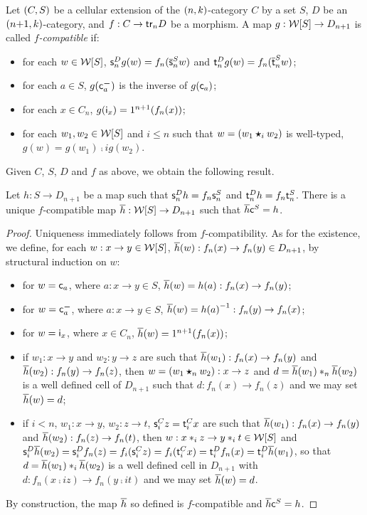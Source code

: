  \begin{paragr}
   Let $(C,S)$ be a cellular extension of the $(n,k)$-category
   $C$ by a set $S$, $D$ be an $(n{+}1,k)$-category, and $f:C\to \mathsf{tr}_{n}
   D$ be a morphism. A map $g:\mathcal{W}[S]\to D_{n+1}$ is called {\em $f$-compatible} if:
   \begin{itemize}
   \item for each $w\in\mathcal{W}[S]$, $\mathsf{s}_{n}^Dg(w)=f_n(\overline{\mathsf{s}}_{n}^S w)$ and
     $\mathsf{t}_{n}^D g(w)=f_n(\overline{\mathsf{t}}_{n}^S w)$;
    \item for each $a\in S$, $g(\mathsf{c}^{\boldsymbol{-}}_{a})$ is the inverse of $g(\mathsf{c}_{a})$;
    \item for each $x\in C_n$, $g(\mathsf{i}_{x})=1^{n+1}(f_n(x))$;
    \item for each $w_1,w_2\in\mathcal{W}[S]$ and $i\leq n$ such that
      $w=(w_1\bm{\star}_{i} w_2)$ is well-typed, $g(w)=g(w_1)\comp i g(w_2)$.  
    \end{itemize}
    Given $C$, $S$, $D$ and $f$ as above, we obtain the following result.
  \end{paragr}
  \begin{lemma}\label{lemma:mapext}
    Let $h:S\to D_{n+1}$ be a map such that $\mathsf{s}_{n}^Dh=f_n \mathsf{s}_{n}^S$ and $\mathsf{t}_{n}^Dh=f_{n} \mathsf{t}_{n}^S$. There is a unique
    $f$-compatible map
    $\overline{h}:\mathcal{W}[S]\to D_{n+1}$
    such that $\overline{h}\mathsf{c}^{S}=h$.
  \end{lemma}
  \begin{proof}
    Uniqueness immediately follows from $f$-compatibility. As for the
    existence, we define, for each $w:x\to y\in\mathcal{W}[S]$,
  $\overline{h}(w):f_n(x)\to f_n(y)\in D_{n+1}$, by structural induction
  on $w$:
  \begin{itemize}
  \item for $w=\mathsf{c}_{a}$, where $a:x\to y\in S$, $\overline{h}(w)=h(a):f_n(x)\to f_n(y)$;
  \item for $w=\mathsf{c}^{\boldsymbol{-}}_{a}$, where $a:x\to y\in S$, $\overline{h}(w)={h(a)}^{-1}:f_n(y)\to f_n(x)$;
  \item for $w=\mathsf{i}_{x}$, where $x\in C_n$, $\overline{h}(w)=1^{n+1}(f_n(x))$;
  \item if $w_1:x\to y$ and $w_2:y\to z$ are such that $\overline{h}(w_1):f_n(x)\to f_n(y)$ and $\overline{h}(w_2):f_n(y)\to f_n(z)$,
    then $w=(w_1\bm{\star}_{n} w_2):x\to z$ and $d=\overline{h}(w_1)\ast_{n}\overline{h}(w_2)$ is a well defined cell of $D_{n+1}$ such that
    $d:f_n(x)\to f_n(z)$ and we may set $\overline{h}(w)=d$;
  \item if $i<n$, $w_1:x\to y$, $w_2:z\to t$, $\mathsf{s}_{i}^Cz=\mathsf{t}_{i}^Cx $
    are such that $\overline{h}(w_1):f_n(x)\to f_n(y)$ and
    $\overline{h}(w_2):f_n(z)\to f_n(t)$, then
    $w:x\ast_{i} z\to y\ast_{i} t\in \mathcal{W}[S]$ and $\mathsf{s}_{i}^D\overline{h}(w_2)=\mathsf{s}_{i}^Df_n(z)=f_i(\mathsf{s}_{i}^Cz)=f_i(\mathsf{t}_{i}^Cx)=\mathsf{t}_{i}^Df_n(x)=\mathsf{t}_{i}^D\overline{h}(w_1)$, so that $d=\overline{h}(w_1)\ast_{i}\overline{h}(w_2)$ is a well defined cell in $D_{n+1}$ with
    $d:f_n(x\comp i z)\to f_n(y\comp i t)$ and we may set $\overline{h}(w)=d$.
  \end{itemize}
  By construction, the map $\overline{h}$ so defined is $f$-compatible
  and $\overline{h}\mathsf{c}^{S} =h$.
  \end{proof}
  
